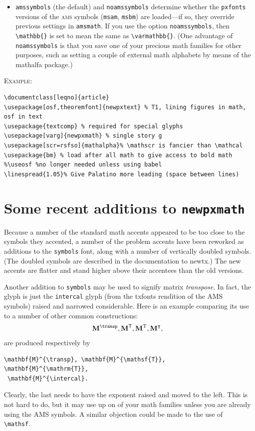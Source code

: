 \documentclass[11pt]{article}
\theoremstyle{oldplain}
\theoremstyle{plain}
\begin{document}
\begin{itemize}
\item {\tt amssymbols} (the default) and {\tt noamssymbols} determine whether the {\tt pxfonts} versions of the \textsc{ams} symbols ({\tt msam}, {\tt msbm}) are loaded---if so, they override previous settings in {\tt amsmath}. If you use the option {\tt noamssymbols}, then \verb|\mathbb{}| is set to mean the same as \verb|\varmathbb{}|. (One advantage of {\tt noamssymbols} is that you save one of your precious math families for other purposes, such as setting a couple of external math alphabets by means of the \textsf{mathalfa} package.)
\end{itemize}

\textsc{Example:}
\begin{verbatim}
\documentclass[leqno]{article}
\usepackage[osf,theoremfont]{newpxtext} % T1, lining figures in math, osf in text
\usepackage{textcomp} % required for special glyphs
\usepackage[varg]{newpxmath} % single story g
\usepackage[scr=rsfso]{mathalpha}% \mathscr is fancier than \mathcal
\usepackage{bm} % load after all math to give access to bold math
%\useosf %no longer needed unless using babel
\linespread{1.05}% Give Palatino more leading (space between lines)
\end{verbatim}

\section{Some recent additions to \texttt{newpxmath}}
Because a number of the standard math accents appeared to be too close to the symbols they accented, a number of the problem accents have been reworked as additions to the {\tt symbols} font, along with a number of vertically doubled symbols. (The doubled symbols are described in the documentation to newtx.) The new accents are flatter and stand higher above their accentees than the old versions.

Another addition to {\tt symbols} may be used to signify matrix \emph{transpose}. In fact, the glyph is just the {\tt intercal} glyph (from the txfonts rendition of the AMS symbols) raised and narrowed considerable. Here is an example comparing its use to a number of other common constructions:
\[\mathbf{M}^{\transp}, \mathbf{M}^{\mathsf{T}}, \mathbf{M}^{\mathrm{T}}, \mathbf{M}^{\intercal},\]
are produced respectively by
\begin{verbatim}
\mathbf{M}^{\transp}, \mathbf{M}^{\mathsf{T}}, \mathbf{M}^{\mathrm{T}},
 \mathbf{M}^{\intercal}.
\end{verbatim}
Clearly, the last needs to have the exponent raised and moved to the left. This is not hard to do, but it may use up on of your math families unless you are already using the AMS symbols. A similar objection could be made to the use of \verb|\mathsf|.
\end{document}
